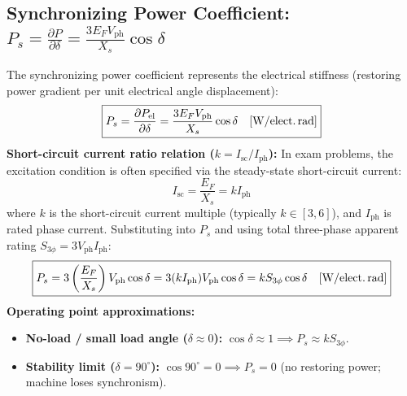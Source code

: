 \subsection{Synchronizing Power Coefficient: \texorpdfstring{$P_s = \frac{\partial P}{\partial\delta} = \frac{3 E_F V_{\mathrm{ph}}}{X_s}\cos\delta$}{Ps = dP/ddelta = (3 EF Vph / Xs) cos delta}}
The synchronizing power coefficient represents the electrical stiffness (restoring power gradient per unit electrical angle displacement):
\begin{equation}
\boxed{P_s = \frac{\partial P_{\mathrm{el}}}{\partial\delta} = \frac{3 E_F V_{\mathrm{ph}}}{X_s}\cos\delta \quad [\mathrm{W/\text{elect.\,rad}}]}
\end{equation}
\textbf{Short-circuit current ratio relation ($k = I_{\mathrm{sc}}/I_{\mathrm{ph}}$):}
In exam problems, the excitation condition is often specified via the steady-state short-circuit current:
\begin{equation}
I_{\mathrm{sc}} = \frac{E_F}{X_s} = k I_{\mathrm{ph}}
\end{equation}
where $k$ is the short-circuit current multiple (typically $k \in [3, 6]$), and $I_{\mathrm{ph}}$ is rated phase current.
Substituting into $P_s$ and using total three-phase apparent rating $S_{3\phi} = 3 V_{\mathrm{ph}} I_{\mathrm{ph}}$:
\begin{equation}
\boxed{P_s = 3\left(\frac{E_F}{X_s}\right)V_{\mathrm{ph}}\cos\delta = 3(k I_{\mathrm{ph}})V_{\mathrm{ph}}\cos\delta = k S_{3\phi}\cos\delta \quad [\mathrm{W/\text{elect.\,rad}}]}
\end{equation}
\textbf{Operating point approximations:}
\begin{itemize}
  \item \textbf{No-load / small load angle ($\delta \approx 0$):} $\cos\delta \approx 1 \implies P_s \approx k S_{3\phi}$.
  \item \textbf{Stability limit ($\delta = 90^\circ$):} $\cos 90^\circ = 0 \implies P_s = 0$ (no restoring power; machine loses synchronism).
\end{itemize}

